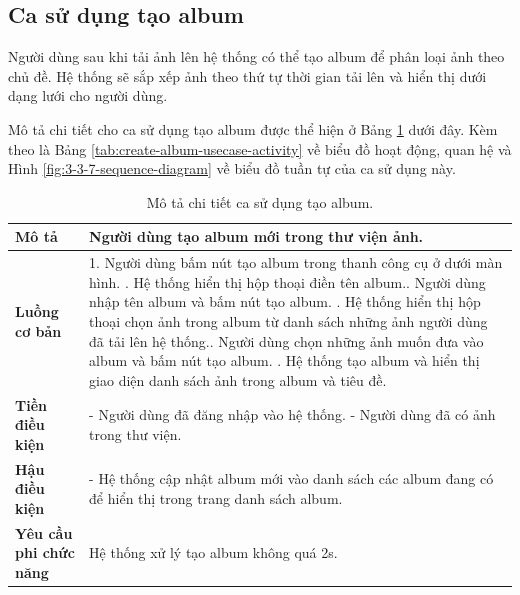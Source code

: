 \subsection{Ca sử dụng tạo album}

Người dùng sau khi tải ảnh lên hệ thống có thể tạo album để phân loại ảnh theo chủ đề. Hệ thống sẽ sắp xếp ảnh theo thứ tự thời gian tải lên và hiển thị dưới dạng lưới cho người dùng.

Mô tả chi tiết cho ca sử dụng tạo album được thể hiện ở Bảng \ref{tab:create-album-usecase} dưới đây. Kèm theo là Bảng \ref{tab:create-album-usecase-activity} về biểu đồ hoạt động, quan hệ và Hình \ref{fig:3-3-7-sequence-diagram} về biểu đồ tuần tự của ca sử dụng này. 

\noindent 

\begin{table}[H]
\centering
\begin{tabularx}{\linewidth}{| l | X |} 
\hline 
\textbf{Mô tả} & Người dùng tạo album mới trong thư viện ảnh. \\
\hline 
\textbf{Luồng cơ bản} & 1. Người dùng bấm nút tạo album trong thanh công cụ ở dưới màn hình. \newline
                       2. Hệ thống hiển thị hộp thoại điền tên album.\newline
                       3. Người dùng nhập tên album và bấm nút tạo album. \newline
                       4. Hệ thống hiển thị hộp thoại chọn ảnh trong album từ danh sách những ảnh người dùng đã tải lên hệ thống.\newline
                       5. Người dùng chọn những ảnh muốn đưa vào album và bấm nút tạo album. \newline
                       6. Hệ thống tạo album và hiển thị giao diện danh sách ảnh trong album và tiêu đề. \\
\hline 
\textbf{Tiền điều kiện} & - Người dùng đã đăng nhập vào hệ thống. \newline
                           - Người dùng đã có ảnh trong thư viện. \\
\hline
\textbf{Hậu điều kiện} & - Hệ thống cập nhật album mới vào danh sách các album đang có để hiển thị trong trang danh sách album. \\
\hline 
\textbf{Yêu cầu phi chức năng} & Hệ thống xử lý tạo album không quá 2s. \\
\hline 
\end{tabularx}
\caption{Mô tả chi tiết ca sử dụng tạo album.}
\label{tab:create-album-usecase}
\end{table}

